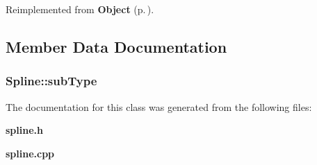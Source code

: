 Reimplemented from {\bf Object} {\rm (p.\,\pageref{classObject_a3})}.

\subsection{Member Data Documentation}
\subsubsection{ Spline::sub\-Type\hspace{0.3cm}{\tt  [private]}}\label{classSpline_o0}




The documentation for this class was generated from the following files:\begin{CompactItemize}
\item 
{\bf spline.h}\item 
{\bf spline.cpp}\end{CompactItemize}
